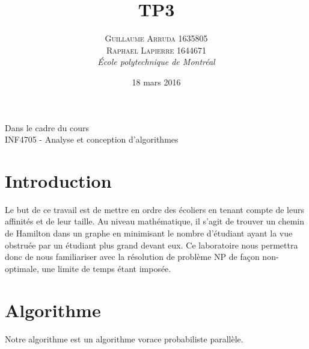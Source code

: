 \documentclass[a4paper, 12pt]{article} %
\title{TP3}
\author{\textsc{Guillaume Arruda 1635805\\Raphael Lapierre 1644671} %
\vspace{10pt}
\\{\textit{École polytechnique de Montréal}}} %
\date{18 mars 2016} %
\makeatletter
\renewcommand{\maketitle}{ %
\begin{center} %

\vspace*{25pt} %
{\LARGE\@title} %

\vspace{125pt} %

{\large\@author} %
\vspace{125pt} %
Dans le cadre du cours
\\INF4705 - Analyse et conception d'algorithmes
\vspace{125pt} %
\\\@date %
\vspace{125pt} %

\end{center}
}
\makeatother
\begin{document}
\thispagestyle{empty}
\clearpage\maketitle %
\pagebreak[4]

\setlength{\headheight}{15.0pt}
\pagestyle{fancy}
\fancyhead[C]{}

\section*{Introduction}
Le but de ce travail est de mettre en ordre des écoliers en tenant compte de leurs affinités et de leur taille.
Au niveau mathématique, il s'agit de trouver un chemin de Hamilton dans un graphe en minimisant le nombre d'étudiant
ayant la vue obstruée par un étudiant plus grand devant eux. Ce laboratoire nous permettra donc de nous familiariser avec
la résolution de problème NP de façon non-optimale, une limite de temps étant imposée.
\section*{Algorithme}
Notre algorithme est un algorithme vorace probabiliste parallèle.
\end{document}
